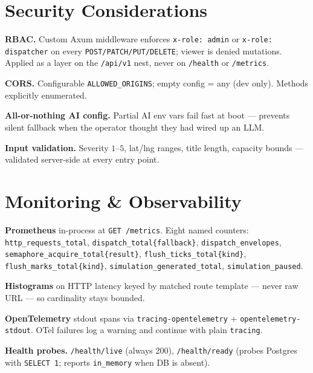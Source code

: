 \documentclass[10pt,letterpaper]{article}
\begin{document}
\section{Security Considerations}
\begin{tightemize}
    \item \textbf{RBAC.} Custom Axum middleware enforces \texttt{x-role: admin} or \texttt{x-role: dispatcher} on every \texttt{POST/PATCH/PUT/DELETE}; viewer is denied mutations. Applied as a layer on the \texttt{/api/v1} nest, never on \texttt{/health} or \texttt{/metrics}.
    \item \textbf{CORS.} Configurable \texttt{ALLOWED\_ORIGINS}; empty config = any (dev only). Methods explicitly enumerated.
    \item \textbf{All-or-nothing AI config.} Partial AI env vars fail fast at boot --- prevents silent fallback when the operator thought they had wired up an LLM.
    \item \textbf{Input validation.} Severity $1$--$5$, lat/lng ranges, title length, capacity bounds --- validated server-side at every entry point.
\end{tightemize}

\section{Monitoring \& Observability}
\begin{tightemize}
    \item \textbf{Prometheus} in-process at \texttt{GET /metrics}. Eight named counters: \texttt{http\_requests\_total}, \texttt{dispatch\_total\{fallback\}}, \texttt{dispatch\_envelopes}, \texttt{semaphore\_acquire\_total\{result\}}, \texttt{flush\_ticks\_total\{kind\}}, \texttt{flush\_marks\_total\{kind\}}, \texttt{simulation\_generated\_total}, \texttt{simulation\_paused}.
    \item \textbf{Histograms} on HTTP latency keyed by matched route template --- never raw URL --- so cardinality stays bounded.
    \item \textbf{OpenTelemetry} stdout spans via \texttt{tracing-opentelemetry} + \texttt{opentelemetry-stdout}. OTel failures log a warning and continue with plain \texttt{tracing}.
    \item \textbf{Health probes.} \texttt{/health/live} (always 200), \texttt{/health/ready} (probes Postgres with \texttt{SELECT 1}; reports \texttt{in\_memory} when DB is absent).
\end{tightemize}
\end{document}
